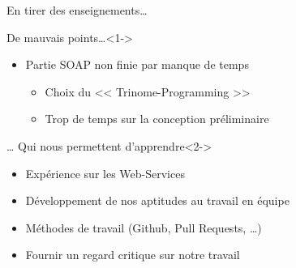 \begin{frame}{En tirer des enseignements…} %
	\begin{alertblock}{De mauvais points…}<1->
\begin{itemize}
	\item Partie SOAP non finie par manque de temps
		\begin{itemize}
			\item Choix du << Trinome-Programming >>
			\item Trop de temps sur la conception préliminaire
		\end{itemize}
\end{itemize}
\end{alertblock}
	\begin{exampleblock}{… Qui nous permettent d'apprendre}<2->
\begin{itemize}
	\item Expérience sur les Web-Services
	\item Développement de nos aptitudes au travail en équipe
	\item Méthodes de travail (Github, Pull Requests, \ldots)
	\item Fournir un regard critique sur notre travail
\end{itemize}
	\end{exampleblock}
\end{frame}
